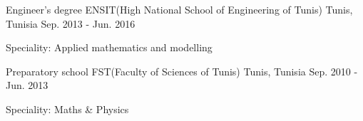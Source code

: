 

\begin{cventries}

  \cventry
    {Engineer's degree} %
    {ENSIT(High National School of Engineering of Tunis)} %
    {Tunis, Tunisia} %
    {Sep. 2013 - Jun. 2016} %
    {
      \begin{cvitems} %
				\item {Speciality: Applied mathematics and modelling}
      \end{cvitems}
    }

	\cventry
		{Preparatory school} %
		{FST(Faculty of Sciences of Tunis)} %
		{Tunis, Tunisia} %
		{Sep. 2010 - Jun. 2013} %
		{
			\begin{cvitems} %
				\item {Speciality: Maths \& Physics}
			\end{cvitems}
		}


\end{cventries}
